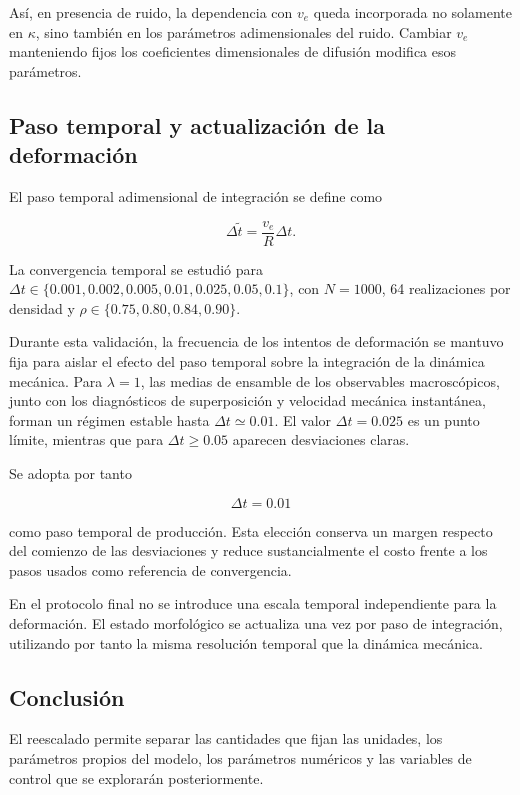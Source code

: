 \documentclass[11pt,a4paper]{article}
\begin{document}
Así, en presencia de ruido, la dependencia con $v_e$
queda incorporada no solamente en $\kappa$, sino
también en los parámetros adimensionales del ruido.
Cambiar $v_e$ manteniendo fijos los coeficientes
dimensionales de difusión modifica esos parámetros.

\subsection{Paso temporal y actualización de la deformación}

El paso temporal adimensional de integración se define como

\begin{equation}
	\Delta\widetilde t
	=
	\frac{v_e}{R}\Delta t.
\end{equation}

La convergencia temporal se estudió para
$\Delta t\in\{0.001,0.002,0.005,0.01,0.025,0.05,0.1\}$, con
$N=1000$, 64 realizaciones por densidad y
$\rho\in\{0.75,0.80,0.84,0.90\}$.

Durante esta validación, la frecuencia de los intentos de deformación se
mantuvo fija para aislar el efecto del paso temporal sobre la integración de
la dinámica mecánica. Para $\lambda=1$, las medias de ensamble de los
observables macroscópicos, junto con los diagnósticos de superposición y
velocidad mecánica instantánea, forman un régimen estable hasta
$\Delta t\simeq0.01$. El valor $\Delta t=0.025$ es un punto límite, mientras que para $\Delta t\geq0.05$ aparecen desviaciones claras.

Se adopta por tanto

\begin{equation}
	\boxed{\Delta t=0.01}
\end{equation}

como paso temporal de producción. Esta elección conserva un margen respecto
del comienzo de las desviaciones y reduce sustancialmente el costo frente a
los pasos usados como referencia de convergencia.

En el protocolo final no se introduce una escala temporal independiente para
la deformación. El estado morfológico se actualiza una vez por paso de
integración, utilizando por tanto la misma resolución temporal que la dinámica
mecánica.

\subsection{Conclusión}

El reescalado permite separar las cantidades que fijan las unidades,
los parámetros propios del modelo, los parámetros numéricos y las
variables de control que se explorarán posteriormente.
\end{document}
